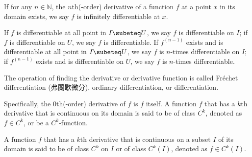 \documentclass[a4paper,12pt]{report}
\begin{document}
If for any $n\in\mathbb{N}$, the $n$th(-order) derivative of a function $f$ at a point $x$ in its domain exists, we say $f$ is infinitely differentiable at $x$.

If $f$ is differentiable at all point in $I\subeteq U$, we say $f$ is differentiable on $I$; if $f$ is differentiable on $U$, we say $f$ is differentiable. If $f^{(n-1)}$ exists and is differentiable at all point in $I\subeteq U$, we say $f$ is $n$-times differentiable on $I$; if $f^{(n-1)}$ exists and is differentiable on $U$, we say $f$ is $n$-times differentiable.

The operation of finding the derivative or derivative function is called Fréchet differentiation (弗蘭歇微分), ordinary differentiation, or differentiation.

Specifically, the $0$th(-order) derivative of $f$ is $f$ itself.
A function $f$ that has a $k$th derivative that is continuous on its domain is said to be of class $C^k$, denoted as $f\in C^k$, or be a $C^k$-function.

A function $f$ that has a $k$th derivative that is continuous on a subset $I$ of its domain is said to be of class $C^k$ on $I$ or of class $C^k(I)$, denoted as $f\in C^k(I)$.
\end{document}
